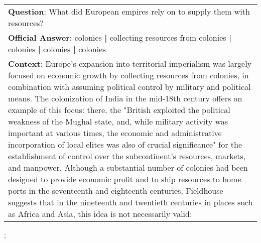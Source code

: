 \begin{figure*}[ht]
{\begin{tabular}{p{}}
            \textbf{Question}: What did European empires rely on to supply them with resources?                                                                                                                                                                                                                                                                                                                                                                                                                                                                                                                                                                                                                                                                                                                                                                                                                                                                                    \\
            \textbf{Official Answer}: colonies \textbf{|} collecting resources from colonies \textbf{|} colonies \textbf{|} colonies \textbf{|} colonies                                                                                                                                                                                                                                                                                                                                                                                                                                                                                                                                                                                                                                                                                                                                                                                                                           \\
            \textbf{Context}: Europe's expansion into territorial imperialism was largely focused on economic growth by collecting resources from colonies, in combination with assuming political control by military and political means. The colonization of India in the mid-18th century offers an example of this focus: there, the "British exploited the political weakness of the Mughal state, and, while military activity was important at various times, the economic and administrative incorporation of local elites was also of crucial significance" for the establishment of control over the subcontinent's resources, markets, and manpower. Although a substantial number of colonies had been designed to provide economic profit and to ship resources to home ports in the seventeenth and eighteenth centuries, Fieldhouse suggests that in the nineteenth and twentieth centuries in places such as Africa and Asia, this idea is not necessarily valid: \\
        \end{tabular}
    };
    \label{fig:ex-573098f38ab72b1400f9c5d3}
\end{figure*}

